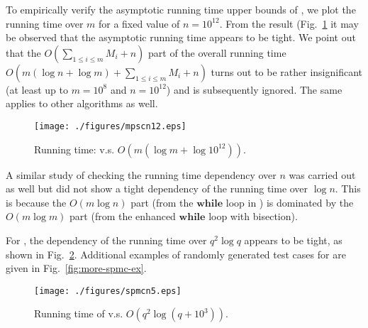 To empirically verify the asymptotic running time upper bounds of 
\algoMRSimple, we plot the running time over $m$ for a fixed value of 
$n =10^{12}$. From the result (Fig.~\ref{fig:mpsc:mfixn} it may be 
observed that the asymptotic running time appears to be tight. We point
out that the $O(\sum_{1\le i \le m} M_i + n)$ part of the overall 
running time $O(m(\log n + \log m) + \sum_{1\le i \le m} M_i + n)$ turns 
out to be rather insignificant (at least up to $m = 10^8$ and $n = 10^12$) 
and is subsequently ignored. The same applies to other algorithms as 
well. 
\begin{figure}[ht!]
    \vspace*{-2mm}
    \centering
    \texttt{[image: ./figures/mpscn12.eps]}
    \vspace*{-4mm}
    \caption{\label{fig:mpsc:mfixn}Running time: \algoMRSimple 
		v.s. $O(m (\log m + \log 10^{12}))$.}
    \vspace*{-3mm}
\end{figure}

A similar study of checking the running time dependency over $n$ was 
carried out as well but did not show a tight dependency of the running 
time over $\log n$. This is because the $O(m\log n)$ part (from the 
$\mathbf{while}$ loop in \algoMRSimple) is dominated by the 
$O(m\log m)$ part (from the enhanced $\mathbf{while}$ loop with bisection). 

For \algoSRG, the dependency of the running time over $q^2\log q$ 
appears to be tight, as shown in Fig.~\ref{fig:spmc:qfixn}. Additional 
examples of randomly generated test cases for \algoSRG are 
given in Fig.~\ref{fig:more-spmc-ex}. 
\begin{figure}[ht!]
    \centering
    \texttt{[image: ./figures/spmcn5.eps]}
    \vspace*{-4mm}
    \caption{\label{fig:spmc:qfixn}Running time of \algoSRG 
		v.s. $O(q^2\log(q + 10^3))$.}
    \vspace*{-2mm}
\end{figure}

